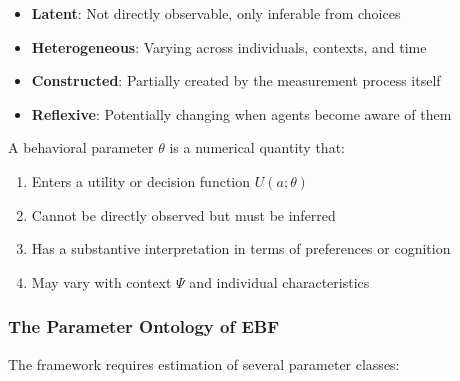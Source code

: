 \begin{itemize}
    \item \textbf{Latent}: Not directly observable, only inferable from choices
    \item \textbf{Heterogeneous}: Varying across individuals, contexts, and time
    \item \textbf{Constructed}: Partially created by the measurement process itself
    \item \textbf{Reflexive}: Potentially changing when agents become aware of them
\end{itemize}

\begin{definition}
\label{def:behavioral-parameter}
A behavioral parameter $\theta$ is a numerical quantity that:
\begin{enumerate}
    \item Enters a utility or decision function $U(a; \theta)$
    \item Cannot be directly observed but must be inferred
    \item Has a substantive interpretation in terms of preferences or cognition
    \item May vary with context $\Psi$ and individual characteristics
\end{enumerate}
\end{definition}

\subsubsection{The Parameter Ontology of EBF}

The framework requires estimation of several parameter classes:

